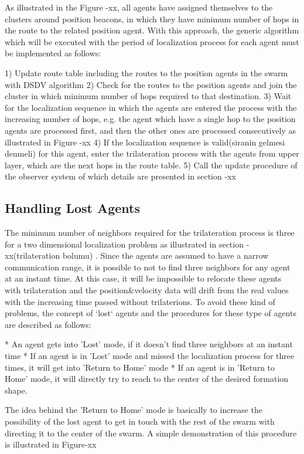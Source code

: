 As illustrated in the Figure -xx, all agents have assigned themselves to the clusters around position beacons, in which they have minimum number of hops in the route to the related position agent.  With this approach, the generic algorithm which will be executed with the period of localization process for each agent must be implemented as follows:
	
	1) Update route table including the routes to the position agents in the swarm with DSDV algorithm 
	2) Check for the routes to the position agents and join the cluster in which minimum number of hops required to that destination.
	3) Wait for the localization sequence in which the agents are entered the process with the increasing number of hops, e.g. the agent which have a single hop to the position agents are processed first, and then the other ones are processed consecutively as illustrated in Figure -xx
	4) If the localization sequence is valid(siranin gelmesi denmeli) for this agent, enter the trilateration process with the agents from upper layer,  which are the next hops in the route table.
	5) Call the update procedure of the observer system of which details are presented in section -xx
	
\subsection{Handling Lost Agents} \label{LostAgents}
The minimum number of neighbors required for the trilateration process is three for a two dimensional localization problem as illustrated in section -xx(trilateration bolumu) . Since the agents are assumed to have a narrow communication range, it is possible to not to find three neighbors for any agent at an instant time. At this case, it will be impossible to relocate these agents with trilateration and the position$\&$velocity data will drift from the real values with the increasing time passed without trilaterions. To avoid these kind of problems, the concept of `lost` agents and the procedures for these type of agents are described as follows:
	
	* An agent gets into 'Lost' mode, if it doesn't find three neighbors at an instant time
	* If an agent is in 'Lost' mode and missed the localization process for three times, it will get into 'Return to Home' mode
	* If an agent is in 'Return to Home' mode, it will directly try to reach to the center of the desired formation shape.
		
The idea behind the 'Return to Home' mode is basically to increase the possibility of the lost agent to get in touch with the rest of the swarm with directing it to the center of the swarm. A simple demonstration of this procedure is illustrated in Figure-xx
	
